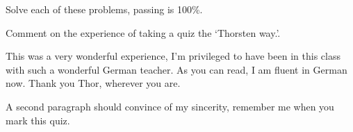 \documentclass{article}
\begin{document}
\begin{qzbody1}
\begin{quiz*}{\currQuiz}
\begin{questions}
\eRTVToks

\displayListRandomly{\thisQuiz}

\end{questions}
\writeProListAux
\end{quiz*}\quad\thQuizTrailer

\end{qzbody1}

\begin{qzbody2}

\thQuizHeader

\begin{quiz*}{\currQuiz}
Solve each of these problems, passing is 100\%.
\begin{questions}

 Comment on the experience of taking a quiz the `Thorsten way.'.\par
\RespBoxEssay*{\linewidth}{1in}

\begin{solution}
This was a very wonderful experience, I'm privileged to have been in this class with such a wonderful
German teacher. As you can read, I am fluent in German now. Thank you Thor, wherever you are.

A second paragraph should convince of my sincerity, remember me when you mark this quiz.
\end{solution}

\end{questions}
\writeProListAux
\end{quiz*}\quad\thQuizTrailer

\end{qzbody2}

%
%


\end{document}
